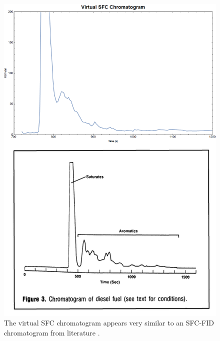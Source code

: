 \begin{figure}
	\centering
	\includegraphics[width=\textwidth]{Figures/VirtualSFC_Compared.png}
	\decoRule	
	
\caption[Comparing SFC-FID and virtual SFC.]{The virtual SFC chromatogram
appears very similar to an SFC-FID chromatogram from literature
\autocite{DiSanzo1991}.}
	
	\label{fig:Virtual_SFC} 
\end{figure}


